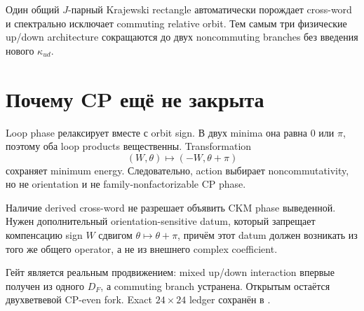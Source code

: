 \begin{theorem}
Один общий \(J\)-парный Krajewski rectangle автоматически порождает
cross-word и спектрально исключает commuting relative orbit. Тем самым три
физические up/down architecture сокращаются до двух noncommuting branches
без введения нового \(\kappa_{ud}\).
\end{theorem}

\section{Почему CP ещё не закрыта}

Loop phase релаксирует вместе с orbit sign. В двух minima она равна \(0\)
или \(\pi\), поэтому оба loop products вещественны. Transformation
\begin{equation}
 (W,\theta)\longmapsto(-W,\theta+\pi)
\end{equation}
сохраняет minimum energy. Следовательно, action выбирает noncommutativity, но
не orientation и не family-nonfactorizable CP phase.

\begin{nogocriterion}
Наличие derived cross-word не разрешает объявить CKM phase выведенной.
Нужен дополнительный orientation-sensitive datum, который запрещает
компенсацию sign \(W\) сдвигом \(\theta\mapsto\theta+\pi\), причём этот datum
должен возникать из того же общего operator, а не из внешнего complex
coefficient.
\end{nogocriterion}

Гейт является реальным продвижением: mixed up/down interaction впервые
получен из одного \(D_F\), а commuting branch устранена. Открытым остаётся
двухветвевой CP-even fork. Exact \(24\times24\) ledger сохранён в
.